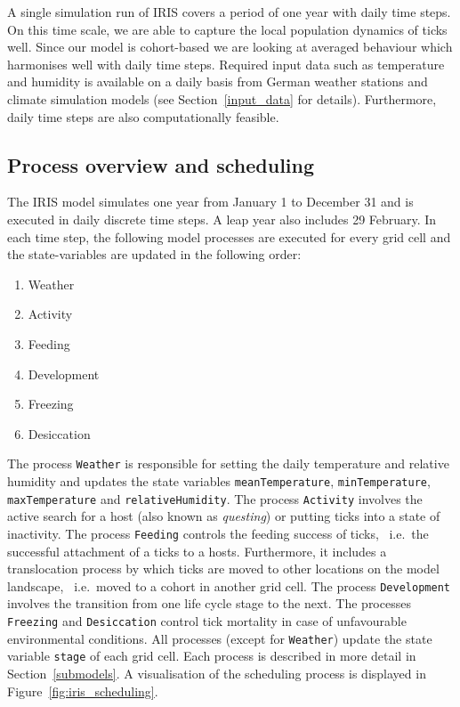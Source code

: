 \documentclass[a4paper, 11pt]{scrartcl}
\newcommand{\inlinecode}[1]{\texttt{\small #1}}
\begin{document}
A single simulation run of IRIS covers a period of one year with daily time steps. On this time scale, we are able to capture the local population dynamics of ticks well. Since our model is cohort-based we are looking at averaged behaviour which harmonises well with daily time steps. Required input data such as temperature and humidity is available on a daily basis from German weather stations and climate simulation models (see Section~\ref{input_data} for details). Furthermore, daily time steps are also computationally feasible.


\subsection{Process overview and scheduling}
The IRIS model simulates one year from January 1 to December 31 and is executed in daily discrete time steps. A leap year also includes 29 February. In each time step, the following model processes are executed for every grid cell and the state-variables are updated in the following order:

\begin{enumerate}[noitemsep]
	\item Weather
	\item Activity
	\item Feeding
	\item Development
	\item Freezing
	\item Desiccation
\end{enumerate}

The process \inlinecode{Weather} is responsible for setting the daily temperature and relative humidity and updates the state variables \inlinecode{meanTemperature}, \inlinecode{minTemperature}, \inlinecode{maxTemperature} and \inlinecode{relativeHumidity}. The process \inlinecode{Activity} involves the active search for a host (also known as \textit{questing}) or putting ticks into a state of inactivity. The process \inlinecode{Feeding} controls the feeding success of ticks, ~i.e.\ the successful attachment of a ticks to a hosts. Furthermore, it includes a translocation process by which ticks are moved to other locations on the model landscape, ~i.e.\ moved to a cohort in another grid cell. The process \inlinecode{Development} involves the transition from one life cycle stage to the next. The processes \inlinecode{Freezing} and \inlinecode{Desiccation} control tick mortality in case of unfavourable environmental conditions. All processes (except for \inlinecode{Weather}) update the state variable \inlinecode{stage} of each grid cell. Each process is described in more detail in Section~\ref{submodels}. A visualisation of the scheduling process is displayed in Figure~\ref{fig:iris_scheduling}.
\end{document}
